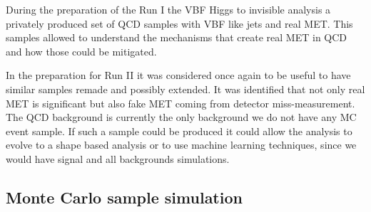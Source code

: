 During the preparation of the Run I the \gls{VBF} Higgs to invisible analysis a privately produced set of \gls{QCD} samples with \gls{VBF} like jets and real \gls{MET}. This samples allowed to understand the mechanisms that create real \gls{MET} in \gls{QCD} and how those could be mitigated. 

In the preparation for Run II it was considered once again to be useful to have similar samples remade and possibly extended. It was identified that not only real \gls{MET} is significant but also fake \gls{MET} coming from detector miss-measurement. The \gls{QCD} background is currently the only background we do not have any \gls{MC} event sample. If such a sample could be produced it could allow the analysis to evolve to a shape based analysis or to use machine learning techniques, since we would have signal and all backgrounds simulations. 

\subsection{Monte Carlo sample simulation}
\label{SUBSECTION:RunIIPreparation_MonteCarloSampleSimulation}


